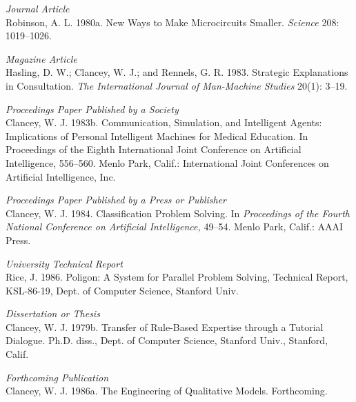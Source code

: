 \documentclass[letterpaper]{article}
\begin{document}
\smallskip \noindent \textit{Journal Article}\\
Robinson, A. L. 1980a. New Ways to Make Microcircuits Smaller. \textit{Science} 208: 1019--1026.

\smallskip \noindent \textit{Magazine Article}\\
Hasling, D. W.; Clancey, W. J.; and Rennels, G. R. 1983. Strategic Explanations in Consultation. \textit{The International Journal of Man-Machine Studies} 20(1): 3--19.

\smallskip \noindent \textit{Proceedings Paper Published by a Society}\\
Clancey, W. J. 1983b. Communication, Simulation, and Intelligent Agents: Implications of Personal Intelligent Machines for Medical Education. In Proceedings of the Eighth International Joint Conference on Artificial Intelligence, 556--560. Menlo Park, Calif.: International Joint Conferences on Artificial Intelligence, Inc.

\smallskip \noindent \textit{Proceedings Paper Published by a Press or Publisher}\\
Clancey, W. J. 1984. Classification Problem Solving. In \textit{Proceedings of the Fourth National Conference on Artificial Intelligence,} 49--54. Menlo Park, Calif.: AAAI Press. 

\smallskip \noindent \textit{University Technical Report}\\
Rice, J. 1986. Poligon: A System for Parallel Problem Solving, Technical Report, KSL-86-19, Dept. of Computer Science, Stanford Univ. 

\smallskip \noindent \textit{Dissertation or Thesis}\\
Clancey, W. J. 1979b. Transfer of Rule-Based Expertise through a Tutorial Dialogue. Ph.D. diss., Dept. of Computer Science, Stanford Univ., Stanford, Calif.

\smallskip \noindent \textit{Forthcoming Publication}\\
Clancey, W. J. 1986a. The Engineering of Qualitative Models. Forthcoming.
\end{document}

